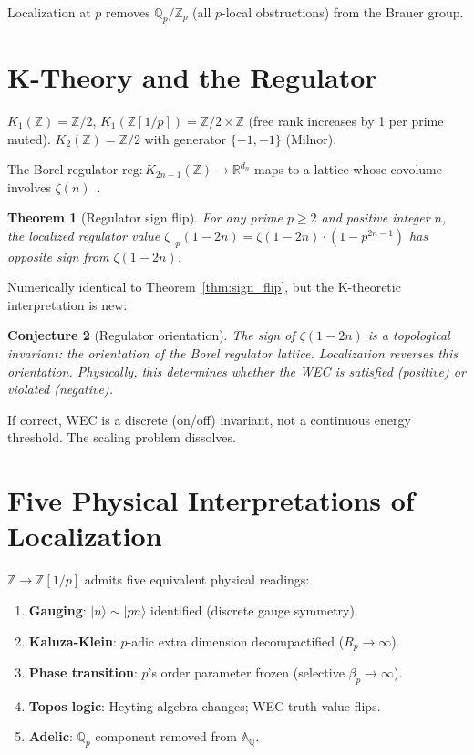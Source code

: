 \documentclass[11pt,a4paper]{article}
\newtheorem{theorem}{Theorem}[section]
\newtheorem{conjecture}[theorem]{Conjecture}
\newcommand{\Zp}{\mathbb{Z}[1/p]}
\newcommand{\Qp}{\mathbb{Q}_p}
\begin{document}
Localization at $p$ removes $\Qp/\mathbb{Z}_p$ (all $p$-local obstructions)
from the Brauer group.

\section{K-Theory and the Regulator}

$K_1(\mathbb{Z}) = \mathbb{Z}/2$, $K_1(\Zp) = \mathbb{Z}/2 \times \mathbb{Z}$
(free rank increases by 1 per prime muted).
$K_2(\mathbb{Z}) = \mathbb{Z}/2$ with generator $\{-1,-1\}$ (Milnor).

The Borel regulator $\mathrm{reg}: K_{2n-1}(\mathbb{Z}) \to \mathbb{R}^{d_n}$
maps to a lattice whose covolume involves $\zeta(n)$~\cite{Borel1977,Lichtenbaum1973}.

\begin{theorem}[Regulator sign flip]
For any prime $p \geq 2$ and positive integer $n$,
the localized regulator value
$\zeta_{\neg p}(1-2n) = \zeta(1-2n)\cdot(1-p^{2n-1})$
has opposite sign from $\zeta(1-2n)$.
\end{theorem}

Numerically identical to Theorem~\ref{thm:sign_flip}, but the
K-theoretic interpretation is new:

\begin{conjecture}[Regulator orientation]
\label{conj:reg}
The sign of $\zeta(1-2n)$ is a topological invariant: the
\emph{orientation} of the Borel regulator lattice.
Localization reverses this orientation.
Physically, this determines whether the WEC is satisfied (positive)
or violated (negative).
\end{conjecture}

If correct, WEC is a discrete (on/off) invariant, not a continuous
energy threshold. The scaling problem dissolves.

\section{Five Physical Interpretations of Localization}

$\mathbb{Z} \to \Zp$ admits five equivalent physical readings:

\begin{enumerate}
\item \textbf{Gauging}: $|n\rangle \sim |pn\rangle$ identified
  (discrete gauge symmetry).
\item \textbf{Kaluza-Klein}: $p$-adic extra dimension decompactified
  ($R_p \to \infty$).
\item \textbf{Phase transition}: $p$'s order parameter frozen
  (selective $\beta_p \to \infty$).
\item \textbf{Topos logic}: Heyting algebra changes; WEC truth value flips.
\item \textbf{Adelic}: $\Qp$ component removed from $\mathbb{A}_\mathbb{Q}$.
\end{enumerate}
\end{document}

